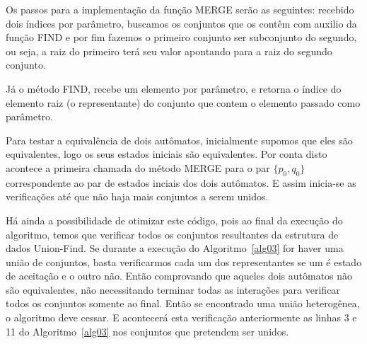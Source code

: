 \documentclass[
	12pt,				%
	openany,
	oneside,
	a4paper,			%
	english,			%
	brazil				%
	]{abntex2}
\begin{document}
  Os passos para a implementação da função MERGE serão as seguintes: recebido dois índices por parâmetro, buscamos os conjuntos que os contêm com auxilio da função FIND e por fim fazemos o primeiro conjunto ser subconjunto do segundo, ou seja, a raiz do primeiro terá seu valor apontando para a raiz do segundo conjunto.

  Já o método FIND, recebe um elemento por parâmetro, e retorna o índice do elemento raiz (o representante) do conjunto que contem o elemento passado como parâmetro.


  Para testar a equivalência de dois autômatos, inicialmente supomos que eles são equivalentes, logo os seus estados iniciais são equivalentes. Por conta disto acontece a primeira chamada do método MERGE para o par $\{p_0, q_0\}$ correspondente ao par de estados inciais dos dois autômatos. E assim inicia-se as verificações até que não haja mais conjuntos a serem unidos.

  Há ainda a possibilidade de otimizar este código, pois ao final da execução do algoritmo, temos que verificar todos os conjuntos resultantes da estrutura de dados Union-Find. Se durante a execução do Algoritmo~\ref{alg03} for haver uma união de conjuntos, basta verificarmos cada um dos representantes se um é estado de aceitação e o outro não. Então comprovando que aqueles dois autômatos não são equivalentes, não necessitando terminar todas as interações para verificar todos os conjuntos somente ao final. Então se encontrado uma união heterogênea, o algoritmo deve cessar. E acontecerá esta verificação anteriormente as linhas 3 e 11 do Algoritmo~\ref{alg03} nos conjuntos que pretendem ser unidos.

\end{document}
